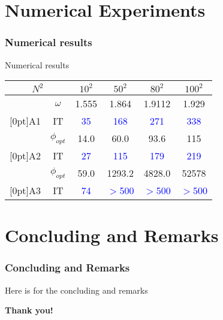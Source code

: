 \documentclass[10pt,compress,t]{beamer}
\newcommand{\myem}[1]{\textcolor{blue}{#1}}
\begin{document}
\section[Experiments]{Numerical Experiments}
\begin{frame}
  \frametitle{Numerical results}
\begin{center}
\begin{small}
 Numerical results\bigskip

\begin{tabular}{|*{6}{c|}}    \hline
\multicolumn{2}{|c|}{$ N^2 $}
        & $10^2$
        & $50^2$ & $80^2$ & $100^2$  \\\hline
        & $ \omega$
        & 1.555
        & 1.864  & 1.9112 & 1.929 \\\cline{2-6}
\raisebox{1.5ex}[0pt]{A1} & IT
        & \myem{35}
        & \myem{168}    & \myem{271}    & \myem{338}  \\\hline
        & $ \phi_{opt}$
        & 14.0
        & 60.0   & 93.6   & 115  \\\cline{2-6}
\raisebox{1.5ex}[0pt]{A2} & IT
        & \myem{27}
        & \myem{115}    & \myem{179}    & \myem{219} \\\hline
        & $ \phi_{opt}$
        & 59.0
        & 1293.2 & 4828.0 & 52578  \\\cline{2-6}
\raisebox{1.5ex}[0pt]{A3} & IT
        & \myem{74}
        & \myem{$>$500} & \myem{$>$500} & \myem{$>$500} \\\hline
\end{tabular}
\end{small}
\end{center}

\end{frame}

\section[Concluding]{Concluding and Remarks}
\begin{frame}
  \frametitle{Concluding and Remarks}

  Here is for the concluding and remarks

\end{frame}


\begin{frame}[plain]
\vspace{0.4\textheight}
\begin{center}
\Huge\color{blue}\bfseries Thank you!
\end{center}
\end{frame}
\end{document}
